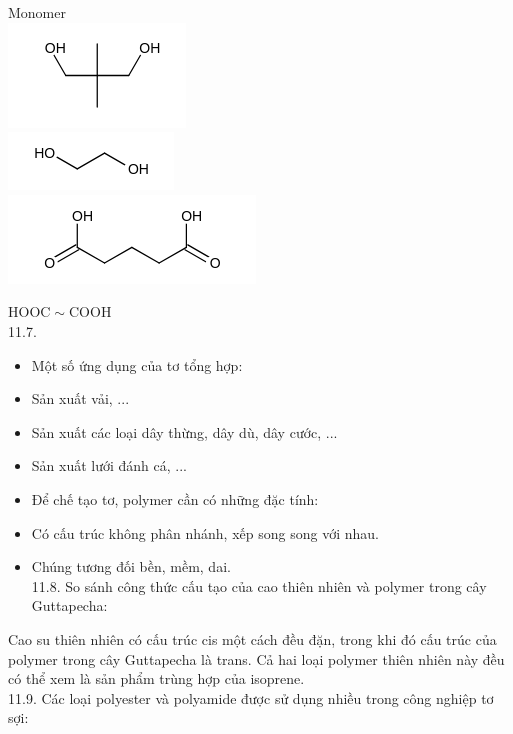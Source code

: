 \documentclass[10pt]{article}
\begin{document}
Monomer\\
\includegraphics{smile-c36d73bd5f1d9a1d40ec0b706f328ee03cf99b70}\\
\includegraphics{smile-d16917d5985f43832af666bf20b4eb5f1faa8233}\\
\includegraphics{smile-875f2ede5b078727e3270bb49dac6c975f089c6e}

$\mathrm{HOOC} \sim \mathrm{COOH}$\\
11.7.

\begin{itemize}
  \item Một số ứng dụng của tơ tổng hợp:
  \item Sản xuất vải, ...
  \item Sản xuất các loại dây thừng, dây dù, dây cước, ...
  \item Sản xuất lưới đánh cá, ...
  \item Để chế tạo tơ, polymer cần có những đặc tính:
  \item Có cấu trúc không phân nhánh, xếp song song với nhau.
  \item Chúng tương đối bền, mềm, dai.\\
11.8. So sánh công thức cấu tạo của cao thiên nhiên và polymer trong cây Guttapecha:
\end{itemize}

Cao su thiên nhiên có cấu trúc cis một cách đều đặn, trong khi đó cấu trúc của polymer trong cây Guttapecha là trans. Cả hai loại polymer thiên nhiên này đều có thể xem là sản phẩm trùng hợp của isoprene.\\
11.9. Các loại polyester và polyamide được sử dụng nhiều trong công nghiệp tơ sợi:
\end{document}
